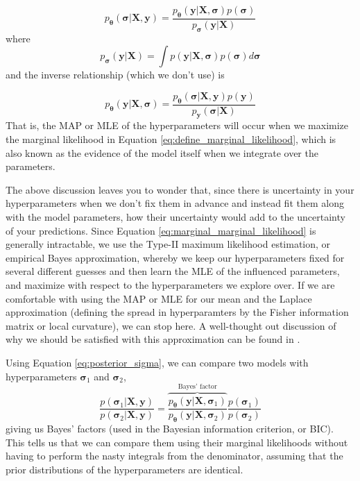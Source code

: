 \documentclass{article}
\begin{document}
\begin{equation}
\label{eq:posterior_sigma}
    p_{\boldsymbol{\theta}}(\boldsymbol{\sigma}|\mathbf{X},\mathbf{y})=\frac{p_\boldsymbol{\theta}(\mathbf{y}|\mathbf{X},\boldsymbol{\sigma})p(\boldsymbol{\sigma})}{p_{\boldsymbol{\sigma}}(\mathbf{y}|\mathbf{X})}
\end{equation}where
\begin{equation}
\label{eq:marginal_marginal_likelihood}
   p_{\boldsymbol{\sigma}}(\mathbf{y}|\mathbf{X})=\int p(\mathbf{y}|\mathbf{X},\boldsymbol{\sigma})p(\boldsymbol{\sigma})d\boldsymbol{\sigma}
\end{equation}and the inverse relationship (which we don't use) is 

\begin{equation}
    p_{\boldsymbol{\theta}}(\mathbf{y}|\mathbf{X},\boldsymbol{\sigma})=\frac{p_\boldsymbol{\theta}(\boldsymbol{\sigma}|\mathbf{X},\mathbf{y})p(\mathbf{y})}{p_{\mathbf{y}}(\boldsymbol{\sigma}|\mathbf{X})}
\end{equation}
That is, the MAP or MLE of the hyperparameters will occur when we maximize the marginal likelihood in Equation \ref{eq:define_marginal_likelihood}, which is also known as the evidence of the model itself when we integrate over the parameters.

The above discussion leaves you to wonder that, since there is uncertainty in your hyperparameters when we don't fix them in advance and instead fit them along with the model parameters, how their uncertainty would add to the uncertainty of your predictions. Since Equation \ref{eq:marginal_marginal_likelihood} is generally intractable, we use the Type-II maximum likelihood estimation, or empirical Bayes approximation, whereby we keep our hyperparameters fixed for several different guesses and then learn the MLE of the influenced parameters, and maximize with respect to the hyperparameters we explore over. If we are comfortable with using the MAP or MLE for our mean and the Laplace approximation (defining the spread in hyperparamters by the Fisher information matrix or local curvature), we can stop here. A well-thought out discussion of why we should be satisfied with this approximation can be found in \cite{MacKay99}.

Using Equation \ref{eq:posterior_sigma}, we can compare two models with hyperparameters $\boldsymbol{\sigma}_1$ and $\boldsymbol{\sigma}_2$, 
\begin{equation}\frac{p(\boldsymbol{\sigma}_1|\mathbf{X},\mathbf{y})}{p(\boldsymbol{\sigma}_2|\mathbf{X},\mathbf{y})}=\overbrace{\frac{p_{\boldsymbol{\theta}}(\mathbf{y}|\mathbf{X},\boldsymbol{\sigma}_1)}{p_{\boldsymbol{\theta}}(\mathbf{y}|\mathbf{X},\boldsymbol{\sigma}_2)}}^\text{Bayes' factor}\frac{p(\boldsymbol{\sigma}_1)}{p(\boldsymbol{\sigma}_2)}\end{equation}giving us Bayes' factors (used in the Bayesian information criterion, or BIC). This tells us that we can compare them using their marginal likelihoods without having to perform the nasty integrals from the denominator, assuming that the prior distributions of the hyperparameters are identical.
\end{document}
